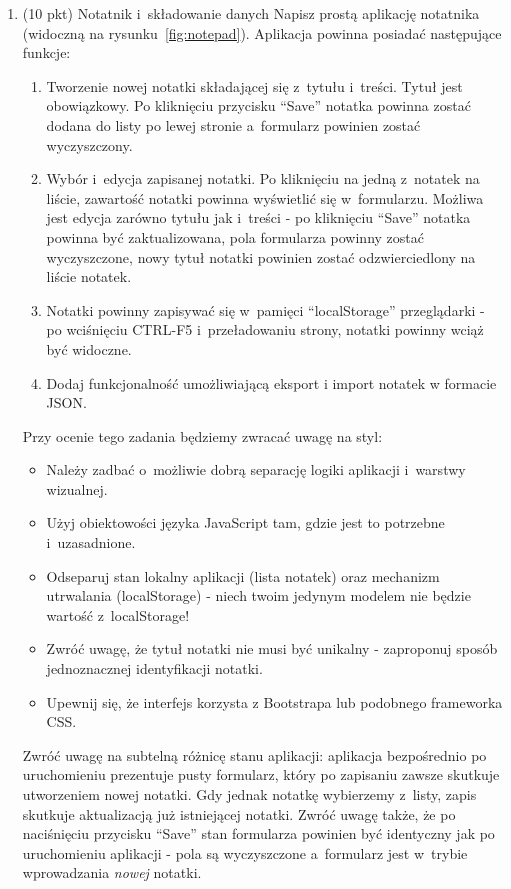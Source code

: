 \documentclass[12pt]{article}
\begin{document}
\begin{enumerate}
            \item\label{exc:notepad}
            (10 pkt) Notatnik i~składowanie danych
            Napisz prostą aplikację notatnika (widoczną na rysunku~\ref{fig:notepad}).
            Aplikacja powinna posiadać następujące funkcje:
            \begin{enumerate}
                \item Tworzenie nowej notatki składającej się z~tytułu i~treści. Tytuł jest obowiązkowy. Po kliknięciu przycisku ``Save'' notatka powinna zostać dodana do listy po lewej stronie a~formularz powinien zostać wyczyszczony.
                \item Wybór i~edycja zapisanej notatki. Po kliknięciu na jedną z~notatek na liście, zawartość notatki powinna wyświetlić się w~formularzu. Możliwa jest edycja zarówno tytułu jak i~treści - po kliknięciu ``Save'' notatka powinna być zaktualizowana, pola formularza powinny zostać wyczyszczone, nowy tytuł notatki powinien zostać odzwierciedlony na liście notatek.
                \item Notatki powinny zapisywać się w~pamięci ``localStorage'' przeglądarki - po wciśnięciu CTRL-F5 i~przeładowaniu strony, notatki powinny wciąż być widoczne.
                \item Dodaj funkcjonalność umożliwiającą eksport i import notatek w formacie JSON.
            \end{enumerate}

            Przy ocenie tego zadania będziemy zwracać uwagę na styl:
            \begin{itemize}
                \item Należy zadbać o~możliwie dobrą separację logiki aplikacji i~warstwy wizualnej.
                \item Użyj obiektowości języka JavaScript tam, gdzie jest to potrzebne i~uzasadnione.
                \item Odseparuj stan lokalny aplikacji (lista notatek) oraz mechanizm utrwalania (localStorage) - niech twoim jedynym modelem nie będzie wartość z~localStorage!
                \item Zwróć uwagę, że tytuł notatki nie musi być unikalny - zaproponuj sposób jednoznacznej identyfikacji notatki.
                \item Upewnij się, że interfejs korzysta z Bootstrapa lub podobnego frameworka CSS.
            \end{itemize}

            Zwróć uwagę na subtelną różnicę stanu aplikacji: aplikacja bezpośrednio po uruchomieniu prezentuje pusty formularz, który po zapisaniu zawsze skutkuje utworzeniem nowej notatki. Gdy jednak notatkę wybierzemy z~listy, zapis skutkuje aktualizacją już istniejącej notatki.
            Zwróć uwagę także, że po naciśnięciu przycisku ``Save'' stan formularza powinien być identyczny jak po uruchomieniu aplikacji - pola są wyczyszczone a~formularz jest w~trybie wprowadzania \emph{nowej} notatki.


\end{enumerate}
\end{document}
